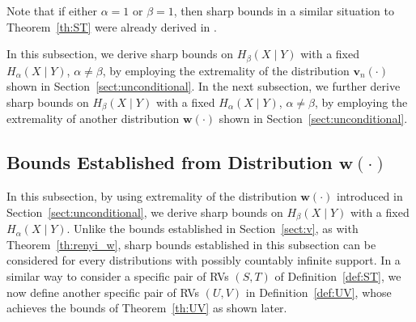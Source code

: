 \documentclass[conference, draftcls, onecolumn]{IEEEtran}
\theoremstyle{plain}
\newcommand{\bvec}[1]{\boldsymbol{#1}}
\newcommand{\thref}[1]{Theorem~\ref{#1}}
\newcommand{\defref}[1]{Definition~\ref{#1}}
\newcommand{\sectref}[1]{Section~\ref{#1}}
\begin{document}
Note that if either $\alpha = 1$ or $\beta = 1$, then sharp bounds in a similar situation to \thref{th:ST} were already derived in \cite[Theorem~2 and Corollary~1]{part2}.

In this subsection, we derive sharp bounds on $H_{\beta}(X \mid Y)$ with a fixed $H_{\alpha}(X \mid Y)$, $\alpha \neq \beta$, by employing the extremality of the distribution $\bvec{v}_{n}( \cdot )$ shown in \sectref{sect:unconditional}.
In the next subsection, we further derive sharp bounds on $H_{\beta}(X \mid Y)$ with a fixed $H_{\alpha}(X \mid Y)$, $\alpha \neq \beta$, by employing the extremality of another distribution $\bvec{w}( \cdot )$ shown in \sectref{sect:unconditional}.



\subsection{Bounds Established from Distribution $\bvec{w}( \cdot )$}
\label{sect:w}


In this subsection, by using extremality of the distribution $\bvec{w}( \cdot )$ introduced in \sectref{sect:unconditional}, we derive sharp bounds on $H_{\beta}(X \mid Y)$ with a fixed $H_{\alpha}(X \mid Y)$.
Unlike the bounds established in \sectref{sect:v}, as with \thref{th:renyi_w}, sharp bounds established in this subsection can be considered for every distributions with possibly countably infinite support.
In a similar way to consider a specific pair of RVs $(S, T)$ of \defref{def:ST}, we now define another specific pair of RVs $(U, V)$ in \defref{def:UV}, whose achieves the bounds of \thref{th:UV} as shown later.
\end{document}

